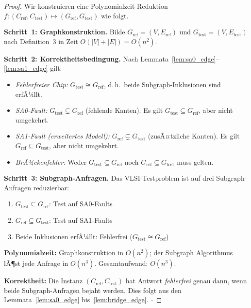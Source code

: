 ﻿\documentclass[a4paper,12pt]{article}
\theoremstyle{definition}
\begin{document}
\begin{proof}
  Wir konstruieren eine Polynomialzeit-Reduktion
  $f: (C_{\mathrm{ref}}, C_{\mathrm{test}}) \mapsto
  (G_{\mathrm{ref}}, G_{\mathrm{test}})$ wie folgt.

  \textbf{Schritt~1: Graph\-konstruktion.}
  Bilde $G_{\mathrm{ref}} = (V, E_{\mathrm{ref}})$ und
  $G_{\mathrm{test}} = (V, E_{\mathrm{test}})$ nach Definition~3
  in Zeit $O(|V| + |E|) = O(n^2)$.

  \textbf{Schritt~2: Korrektheitsbedingung.}
  Nach Lemmata~\ref{lem:sa0_edge}--\ref{lem:sa1_edge} gilt:
  \begin{itemize}
    \item \emph{Fehlerfreier Chip:} $G_{\mathrm{test}} \cong G_{\mathrm{ref}}$,
          d.\,h.\ beide Subgraph-Inklusionen sind erfÃ¼llt.
    \item \emph{SA0-Fault:} $G_{\mathrm{test}} \subsetneq G_{\mathrm{ref}}$
          (fehlende Kanten). Es gilt
          $G_{\mathrm{test}} \subseteq G_{\mathrm{ref}}$,
          aber nicht umgekehrt.
    \item \emph{SA1-Fault (erweitertes Modell):}
          $G_{\mathrm{ref}} \subsetneq G_{\mathrm{test}}$
          (zusÃ¤tzliche Kanten). Es gilt
          $G_{\mathrm{ref}} \subseteq G_{\mathrm{test}}$,
          aber nicht umgekehrt.
    \item \emph{BrÃ¼ckenfehler:} Weder
          $G_{\mathrm{test}} \subseteq G_{\mathrm{ref}}$ noch
          $G_{\mathrm{ref}} \subseteq G_{\mathrm{test}}$ muss gelten.
  \end{itemize}

  \textbf{Schritt~3: Subgraph-Anfragen.}
  Das VLSI-Testproblem ist auf drei Subgraph-Anfragen reduzierbar:
  \begin{enumerate}
    \item[(i)]   $G_{\mathrm{test}} \subseteq G_{\mathrm{ref}}$:
                 Test auf SA0-Faults
    \item[(ii)]  $G_{\mathrm{ref}} \subseteq G_{\mathrm{test}}$:
                 Test auf SA1-Faults
    \item[(iii)] Beide Inklusionen erfÃ¼llt: Fehlerfrei
                 ($G_{\mathrm{test}} \cong G_{\mathrm{ref}}$)
  \end{enumerate}

  \textbf{Polynomialzeit:} Graphkonstruktion in $O(n^2)$; der
  Subgraph Algorithmus lÃ¶st jede Anfrage in $O(n^3)$.
  Gesamtaufwand: $O(n^3)$.

  \textbf{Korrektheit:} Die Instanz
  $(C_{\mathrm{ref}}, C_{\mathrm{test}})$ hat Antwort
  \emph{fehlerfrei} genau dann, wenn beide Subgraph-Anfragen bejaht
  werden. Dies folgt aus den Lemmata~\ref{lem:sa0_edge}
  bis~\ref{lem:bridge_edge}. $\square$
\end{proof}
\end{document}
